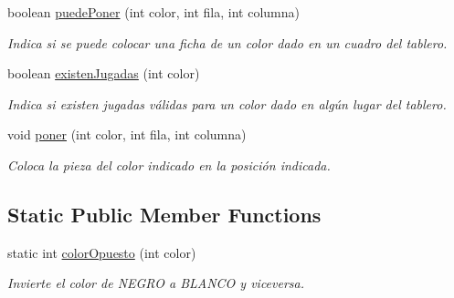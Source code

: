 \begin{DoxyCompactItemize}
boolean \mbox{\hyperlink{class_tablero_afbf952c36374051ba9d9a007ad2c673d}{puede\+Poner}} (int color, int fila, int columna)
\begin{DoxyCompactList}\small\item\em Indica si se puede colocar una ficha de un color dado en un cuadro del tablero. \end{DoxyCompactList}\item 
boolean \mbox{\hyperlink{class_tablero_a0b225d49792c0db4742c1e6aea909647}{existen\+Jugadas}} (int color)
\begin{DoxyCompactList}\small\item\em Indica si existen jugadas válidas para un color dado en algún lugar del tablero. \end{DoxyCompactList}\item 
void \mbox{\hyperlink{class_tablero_a22addb609780226aa6371c818b4d5a12}{poner}} (int color, int fila, int columna)
\begin{DoxyCompactList}\small\item\em Coloca la pieza del color indicado en la posición indicada. \end{DoxyCompactList}\end{DoxyCompactItemize}
\subsection*{Static Public Member Functions}
\begin{DoxyCompactItemize}
\item 
static int \mbox{\hyperlink{class_tablero_a0cdaee39a2bd8bd7fa59b2c19958650c}{color\+Opuesto}} (int color)
\begin{DoxyCompactList}\small\item\em Invierte el color de N\+E\+G\+RO a B\+L\+A\+N\+CO y viceversa. \end{DoxyCompactList}\end{DoxyCompactItemize}

